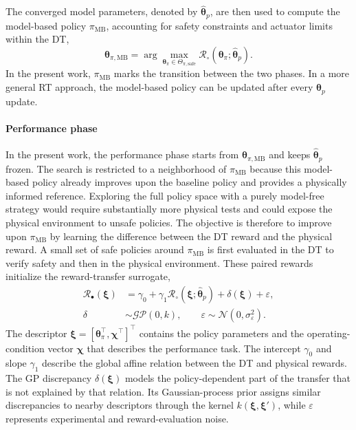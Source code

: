 \documentclass[journal]{IEEEtran}
\begin{document}
The converged model parameters, denoted by $\widehat{\boldsymbol{\theta}}_p$, are then used to compute the model-based policy $\pi_{\mathrm{MB}}$, accounting for safety constraints and actuator limits within the DT,
\begin{equation}
\boldsymbol{\theta}_{\pi,\mathrm{MB}}
=
\arg\max_{\boldsymbol{\theta}_{\pi}\in\Theta_{\pi,\mathrm{safe}}}
\mathcal R_{\circ}\!\left(
\boldsymbol{\theta}_{\pi};
\widehat{\boldsymbol{\theta}}_p
\right).
\label{eq:rt-mb-optimum}
\end{equation}
In the present work, $\pi_{\mathrm{MB}}$ marks the transition between the two phases. In a more general RT approach, the model-based policy can be updated after every $\boldsymbol{\theta}_p$ update.

\paragraph*{Performance phase}
In the present work, the performance phase starts from $\boldsymbol{\theta}_{\pi,\mathrm{MB}}$ and keeps $\widehat{\boldsymbol{\theta}}_p$ frozen. The search is restricted to a neighborhood of $\pi_{\mathrm{MB}}$ because this model-based policy already improves upon the baseline policy and provides a physically informed reference. Exploring the full policy space with a purely model-free strategy would require substantially more physical tests and could expose the physical environment to unsafe policies. The objective is therefore to improve upon $\pi_{\mathrm{MB}}$ by learning the difference between the DT reward and the physical reward. A small set of safe policies around $\pi_{\mathrm{MB}}$ is first evaluated in the DT to verify safety and then in the physical environment. These paired rewards initialize the reward-transfer surrogate,
\begin{equation}
\begin{aligned}
\mathcal R_{\bullet}(\boldsymbol\xi)
&=\gamma_0+
\gamma_1\mathcal R_{\circ}
(\boldsymbol\xi;\widehat{\boldsymbol{\theta}}_p)
+\delta(\boldsymbol\xi)+\varepsilon,\\
\delta&\sim\mathcal{GP}(0,k),\qquad
\varepsilon\sim\mathcal N(0,\sigma_{\varepsilon}^{2}).
\end{aligned}
\label{eq:rt-surrogate}
\end{equation}
The descriptor $\boldsymbol\xi=[\boldsymbol{\theta}_{\pi}^{\top},\boldsymbol\chi^{\top}]^{\top}$ contains the policy parameters and the operating-condition vector $\boldsymbol\chi$ that describes the performance task. The intercept $\gamma_0$ and slope $\gamma_1$ describe the global affine relation between the DT and physical rewards. The GP discrepancy $\delta(\boldsymbol\xi)$ models the policy-dependent part of the transfer that is not explained by that relation. Its Gaussian-process prior assigns similar discrepancies to nearby descriptors through the kernel $k(\boldsymbol\xi,\boldsymbol\xi')$, while $\varepsilon$ represents experimental and reward-evaluation noise.
\end{document}
